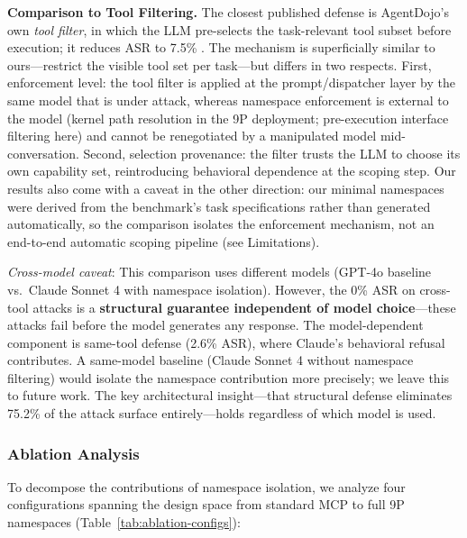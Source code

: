 \documentclass{article}
\begin{document}
\textbf{Comparison to Tool Filtering.} The closest published defense is AgentDojo's own \textit{tool filter}, in which the LLM pre-selects the task-relevant tool subset before execution; it reduces ASR to 7.5\% \cite{debenedetti2024agentdojo}. The mechanism is superficially similar to ours---restrict the visible tool set per task---but differs in two respects. First, enforcement level: the tool filter is applied at the prompt/dispatcher layer by the same model that is under attack, whereas namespace enforcement is external to the model (kernel path resolution in the 9P deployment; pre-execution interface filtering here) and cannot be renegotiated by a manipulated model mid-conversation. Second, selection provenance: the filter trusts the LLM to choose its own capability set, reintroducing behavioral dependence at the scoping step. Our results also come with a caveat in the other direction: our minimal namespaces were derived from the benchmark's task specifications rather than generated automatically, so the comparison isolates the enforcement mechanism, not an end-to-end automatic scoping pipeline (see Limitations).

\textit{Cross-model caveat}: This comparison uses different models (GPT-4o baseline vs.\ Claude Sonnet 4 with namespace isolation). However, the 0\% ASR on cross-tool attacks is a \textbf{structural guarantee independent of model choice}---these attacks fail before the model generates any response. The model-dependent component is same-tool defense (2.6\% ASR), where Claude's behavioral refusal contributes. A same-model baseline (Claude Sonnet 4 without namespace filtering) would isolate the namespace contribution more precisely; we leave this to future work. The key architectural insight---that structural defense eliminates 75.2\% of the attack surface entirely---holds regardless of which model is used.

\subsubsection{Ablation Analysis}
\label{sec:ablation}

To decompose the contributions of namespace isolation, we analyze four configurations spanning the design space from standard MCP to full 9P namespaces (Table~\ref{tab:ablation-configs}):
\end{document}
